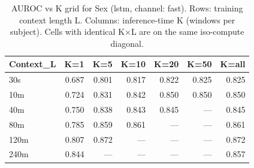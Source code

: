 \begin{table}[ht]
\centering
\caption{AUROC vs K grid for Sex (lstm, channel: fast). Rows: training context length L. Columns: inference-time K (windows per subject). Cells with identical K×L are on the same iso-compute diagonal.}
\label{tab:kgrid_sex_binary_lstm_fast}
\begin{tabular}{lrrrrrr}
\toprule
Context_L & K=1 & K=5 & K=10 & K=20 & K=50 & K=all \\
\midrule
30s & 0.687 & 0.801 & 0.817 & 0.822 & 0.825 & 0.825 \\
10m & 0.724 & 0.831 & 0.842 & 0.850 & 0.850 & 0.850 \\
40m & 0.750 & 0.838 & 0.843 & 0.845 & — & 0.845 \\
80m & 0.785 & 0.859 & 0.861 & — & — & 0.861 \\
120m & 0.807 & 0.872 & — & — & — & 0.872 \\
240m & 0.844 & — & — & — & — & 0.857 \\
\bottomrule
\end{tabular}
\end{table}